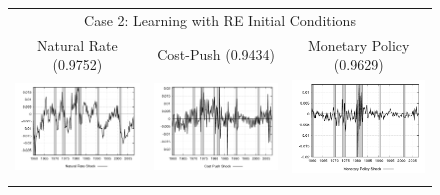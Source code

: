 \begin{figure}
\begin{tabular}{ccc}
\multicolumn{3}{c}{Case 2: Learning with RE Initial Conditions} \\ 
Natural Rate (0.9752) & Cost-Push (0.9434) & Monetary Policy (0.9629) \\
\includegraphics[scale=0.3]{results_reallinit/natrateshock.png} & 
\includegraphics[scale=0.3]{results_reallinit/costpushshock.png} & 
\includegraphics[scale=0.3]{results_reallinit/mpshock.png} \\ \\ 
 

\end{tabular}
\end{figure}
